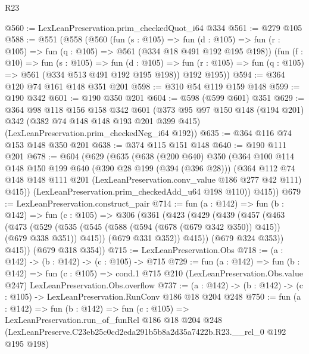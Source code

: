 \begin{lexlean}{R23}
\begin{coremodule}
@560 := LexLeanPreservation.prim_checkedQuot_i64 @334
@561 := @279 @105
@588 := @551
    (@558
      (@560
        (fun (s : @105) =>
        fun (d : @105) => fun (r : @105) => fun (q : @105) => @561 (@334 @18 @491 @192 @195 @198))
        (fun (f : @10) =>
        fun (s : @105) =>
        fun (d : @105) => fun (r : @105) => fun (q : @105) => @561 (@334 @513 @491 @192 @195 @198))
        @192
        @195))
@594 := @364 @120 @74 @161 @148 @351 @201
@598 := @310 @54 @119 @159 @148
@599 := @190 @342
@601 := @190 @350 @201
@604 := @598 (@599 @601) @351
@629 := @364
    @98
    @118
    @156
    @158
    @342
    @601
    (@373
      @95
      @97
      @150
      @148
      (@194 @201)
      @342
      (@382 @74 @148 @148 @193 @201 @399 @415)
      (LexLeanPreservation.prim_checkedNeg_i64 @192))
@635 := @364 @116 @74 @153 @148 @350 @201
@638 := @374 @115 @151 @148
@640 := @190 @111 @201
@678 := @604
    (@629
      (@635
        (@638
          (@200 @640)
          @350
          (@364
            @100
            @114
            @148
            @150
            @199
            @640
            (@390 @28 @199 (@394 (@396 @28)))
            (@364
              @112
              @74
              @148
              @148
              @111
              @201
              (LexLeanPreservation.conv_value @186 @277 @42 @111)
              @415))
          (LexLeanPreservation.prim_checkedAdd_u64 @198 @110))
        @415))
@679 := LexLeanPreservation.construct_pair
@714 := fun (a : @142) =>
  fun (b : @142) =>
  fun (c : @105) =>
  @306
    (@361
      (@423
        (@429
          (@439
            (@457
              (@463
                (@473
                  (@529
                    (@535 (@545 (@588 (@594 (@678 (@679 @342 @350)) @415)) (@679 @338 @351)) @415))
                  (@679 @331 @352))
                @415))
            (@679 @324 @353))
          @415))
      (@679 @318 @354))
@715 := LexLeanPreservation.Obs
@718 := (a : @142) -> (b : @142) -> (c : @105) -> @715
@729 := fun (a : @142) =>
  fun (b : @142) =>
  fun (c : @105) =>
  cond.{1} @715 @210 (LexLeanPreservation.Obs.value @247) LexLeanPreservation.Obs.overflow
@737 := (a : @142) -> (b : @142) -> (c : @105) -> LexLeanPreservation.RunConv @186 @18 @204 @248
@750 := fun (a : @142) =>
  fun (b : @142) =>
  fun (c : @105) =>
  LexLeanPreservation.run_of_funRel
    @186
    @18
    @204
    @248
    (LexLeanPreserve.C23eb25c0cd2eda291b5b8a2d35a7422b.R23.__rel_0 @192 @195 @198)
\end{coremodule}
\end{lexlean}
